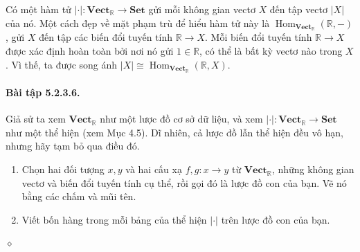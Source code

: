 Có một hàm tử $|\cdot|:\mathbf{Vect}_{\mathbb R}\to\mathbf{Set}$ gửi mỗi không gian vectơ $X$ đến tập vectơ $|X|$ của nó. Một cách đẹp về mặt phạm trù để hiểu hàm tử này là $\operatorname{Hom}_{\mathbf{Vect}_{\mathbb R}}(\mathbb R,-)$, gửi $X$ đến tập các biến đổi tuyến tính $\mathbb R\to X$. Mỗi biến đổi tuyến tính $\mathbb R\to X$ được xác định hoàn toàn bởi nơi nó gửi $1\in\mathbb R$, có thể là bất kỳ vectơ nào trong $X$. Vì thế, ta được song ánh $|X|\cong\operatorname{Hom}_{\mathbf{Vect}_{\mathbb R}}(\mathbb R,X)$.
\paragraph{Bài tập 5.2.3.6.} Giả sử ta xem $\mathbf{Vect}_{\mathbb R}$ như một lược đồ cơ sở dữ liệu, và xem $|\cdot|:\mathbf{Vect}_{\mathbb R}\to\mathbf{Set}$ như một thể hiện (xem Mục 4.5). Dĩ nhiên, cả lược đồ lẫn thể hiện đều vô hạn, nhưng hãy tạm bỏ qua điều đó.
\begin{enumerate}[label=\alph*.]
\item Chọn hai đối tượng $x,y$ và hai cấu xạ $f,g:x\to y$ từ $\mathbf{Vect}_{\mathbb R}$, những không gian vectơ và biến đổi tuyến tính cụ thể, rồi gọi đó là lược đồ con của bạn. Vẽ nó bằng các chấm và mũi tên.
\item Viết bốn hàng trong mỗi bảng của thể hiện $|\cdot|$ trên lược đồ con của bạn.
\end{enumerate}\hfill$\diamond$
